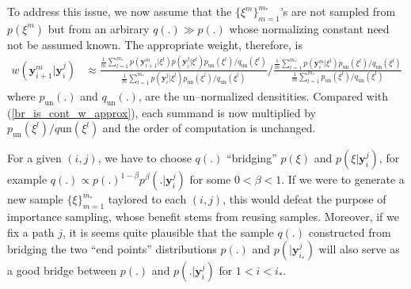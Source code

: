 \documentclass[11pt]{article}
\begin{document}
To address this issue, we now assume that the $\{\xi^m\}_{m=1}^{m_*}$'s are not sampled from $p(\xi^{m})$ but from an arbirary $q(.)\gg p(.)$ whose normalizing constant need not be assumed known. The appropriate weight, therefore, is
\begin{align}\label{br_is_cont_w_approx_q}
w(\mathbf{y}_{i+1}^m|\mathbf{y}_i^j)&\approx\frac{\frac{1}{m}\sum_{l=1}^{m_*}p(\mathbf{y}_{i+1}^m|\xi^l)p(\mathbf{y}_i^j|\xi^l)p_\mathrm{un}(\xi^l)/q_\mathrm{un}(\xi^l)}{\frac{1}{m}\sum_{l=1}^{m_*}p(\mathbf{y}_i^j|\xi^l)p_\mathrm{un}(\xi^l)/q_\mathrm{un}(\xi^l)}/\frac{\frac{1}{m}\sum_{l=1}^{m_*}p(\mathbf{y}_i^m|\xi^l)p_\mathrm{un}(\xi^l)/q_\mathrm{un}(\xi^l)}{\frac{1}{m}\sum_{l=1}^{m_*}p_\mathrm{un}(\xi^l)/q_\mathrm{un}(\xi^l)}
\end{align}where $p_{\mathrm{un}}(.)$ and $q_{\mathrm{un}}(.)$, are the un--normalized densitities. Compared with (\ref{br_is_cont_w_approx}), each summand is now multiplied by $p_\mathrm{un}(\xi^l)/q\mathrm{un}(\xi^l)$ and the order of computation is unchanged.

For a given $(i,j)$, we have to choose $q(.)$ ``bridging'' $p(\xi)$ and $p(\xi|\mathbf{y}_i^j)$, for example $q(.)\propto p(.)^{1-\beta}p^{\beta}(.|\mathbf{y}_i^{j})$ for some $0<\beta<1$. If we were to generate a new sample $\{\xi\}_{m=1}^{m_*}$ taylored to each $(i,j)$, this would defeat the purpose of importance sampling, whose benefit stems from reusing samples. Moreover, if we fix a path $j$, it is seems quite plausible that the sample $q(.)$ constructed from bridging the two ``end points'' distributions $p(.)$  and $p(|\mathbf{y}_{i_*}^j)$ will also serve as a good bridge between $p(.)$ and $p(.|\mathbf{y}_i^j)$ for $1<i<i_*$.
\end{document}
